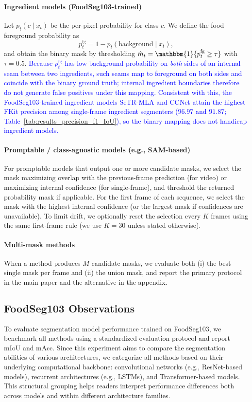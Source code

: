 \documentclass[preprint,12pt]{elsarticle}
\newcommand{\change}[1]{\textcolor{blue}{#1}}
\begin{document}
\paragraph{Ingredient models (FoodSeg103-trained)}
Let $p_t(c \mid x_t)$ be the per-pixel probability for class $c$. We define the food foreground probability as
\begin{equation}
p^{\text{fg}}_t = 1 - p_t(\text{background} \mid x_t),
\end{equation}
and obtain the binary mask by thresholding $\hat m_t = \mathbbm{1}\{p^{\text{fg}}_t \ge \tau\}$ with $\tau=0.5$. \change{Because $p^{\text{fg}}_t$ has low background probability on \emph{both} sides of an internal seam between two ingredients, such seams map to foreground on both sides and coincide with the binary ground truth; internal ingredient boundaries therefore do not generate false positives under this mapping. Consistent with this, the FoodSeg103-trained ingredient models SeTR-MLA and CCNet attain the highest FKit precision among single-frame ingredient segmenters ($96.97$ and $91.87$; Table~\ref{tab:results_precision_f1_IoU}), so the binary mapping does not handicap ingredient models.}

\paragraph{Promptable / class-agnostic models (e.g., SAM-based)}
For promptable models that output one or more candidate masks, we select the mask maximizing overlap with the previous-frame prediction (for video) or maximizing internal confidence (for single-frame), and threshold the returned probability mask if applicable. For the first frame of each sequence, we select the mask with the highest internal confidence (or the largest mask if confidences are unavailable). To limit drift, we optionally reset the selection every $K$ frames using the same first-frame rule (we use $K=30$ unless stated otherwise).

 
\paragraph{Multi-mask methods}
When a method produces $M$ candidate masks, we evaluate both (i) the best single mask per frame and (ii) the union mask, and report the primary protocol in the main paper and the alternative in the appendix.



\subsection{FoodSeg103 Observations}
To evaluate segmentation model performance trained on FoodSeg103, we benchmark all methods using a standardized evaluation protocol \cite{wu2021large} and report mIoU and mAcc. Since this experiment aims to compare the segmentation abilities of various architectures, we categorize all methods based on their underlying computational backbone: convolutional networks (e.g., ResNet-based models), recurrent architectures (e.g., LSTMs), and Transformer-based models. This structural grouping helps readers interpret performance differences both across models and within different architecture families.
\end{document}

